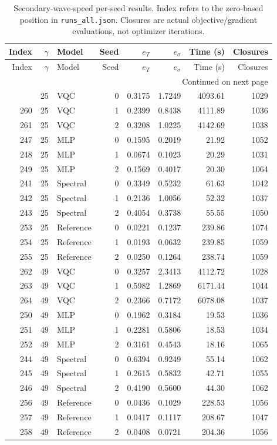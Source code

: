 \documentclass[11pt]{article}
\begin{document}
\begingroup\scriptsize
\setlength{\tabcolsep}{3pt}
\begin{longtable}{rrlrrrrr}
\caption{Secondary-wave-speed per-seed results. Index refers to the
zero-based position in \texttt{runs\_all.json}. Closures are actual
objective/gradient evaluations, not optimizer iterations.}
\label{tab:gamma-seeds}\\
\toprule
Index & $\gamma$ & Model & Seed & $e_T$ & $e_\sigma$ & Time (s) & Closures \\
\midrule\endfirsthead
\toprule
Index & $\gamma$ & Model & Seed & $e_T$ & $e_\sigma$ & Time (s) & Closures \\
\midrule\endhead
\midrule\multicolumn{8}{r}{Continued on next page}\\\endfoot
\bottomrule\endlastfoot
259 & 25 & VQC & 0 & 0.3175 & 1.7249 & 4093.61 & 1029 \\
260 & 25 & VQC & 1 & 0.2399 & 0.8438 & 4111.89 & 1036 \\
261 & 25 & VQC & 2 & 0.3208 & 1.0225 & 4142.69 & 1038 \\
247 & 25 & MLP & 0 & 0.1595 & 0.2019 & 21.92 & 1052 \\
248 & 25 & MLP & 1 & 0.0674 & 0.1023 & 20.29 & 1031 \\
249 & 25 & MLP & 2 & 0.1569 & 0.4017 & 20.30 & 1064 \\
241 & 25 & Spectral & 0 & 0.3349 & 0.5232 & 61.63 & 1042 \\
242 & 25 & Spectral & 1 & 0.2136 & 1.0056 & 52.32 & 1037 \\
243 & 25 & Spectral & 2 & 0.4054 & 0.3738 & 55.55 & 1050 \\
253 & 25 & Reference & 0 & 0.0221 & 0.1237 & 239.86 & 1074 \\
254 & 25 & Reference & 1 & 0.0193 & 0.0632 & 239.85 & 1059 \\
255 & 25 & Reference & 2 & 0.0250 & 0.1264 & 238.74 & 1059 \\
262 & 49 & VQC & 0 & 0.3257 & 2.3413 & 4112.72 & 1028 \\
263 & 49 & VQC & 1 & 0.5982 & 1.2869 & 6171.44 & 1044 \\
264 & 49 & VQC & 2 & 0.2366 & 0.7172 & 6078.08 & 1037 \\
250 & 49 & MLP & 0 & 0.1962 & 0.3184 & 19.53 & 1036 \\
251 & 49 & MLP & 1 & 0.2281 & 0.5806 & 18.53 & 1034 \\
252 & 49 & MLP & 2 & 0.3161 & 0.4543 & 18.16 & 1065 \\
244 & 49 & Spectral & 0 & 0.6394 & 0.9249 & 55.14 & 1062 \\
245 & 49 & Spectral & 1 & 0.2615 & 0.5832 & 42.71 & 1055 \\
246 & 49 & Spectral & 2 & 0.4190 & 0.5600 & 44.30 & 1062 \\
256 & 49 & Reference & 0 & 0.0436 & 0.1029 & 228.53 & 1056 \\
257 & 49 & Reference & 1 & 0.0417 & 0.1117 & 208.67 & 1047 \\
258 & 49 & Reference & 2 & 0.0408 & 0.0721 & 204.36 & 1056 \\
\end{longtable}
\endgroup

\FloatBarrier


\end{document}
